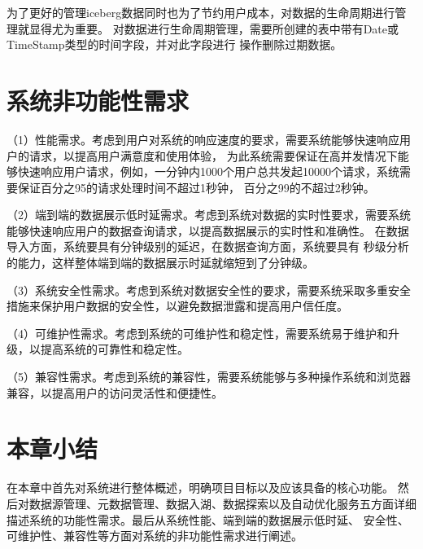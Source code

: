 为了更好的管理iceberg数据同时也为了节约用户成本，对数据的生命周期进行管理就显得尤为重要\cite{36}。
对数据进行生命周期管理，需要所创建的表中带有Date或TimeStamp类型的时间字段，并对此字段进行
操作删除过期数据。

\section{系统非功能性需求}

（1）性能需求。考虑到用户对系统的响应速度的要求，需要系统能够快速响应用户的请求，以提高用户满意度和使用体验，
为此系统需要保证在高并发情况下能够快速响应用户请求，例如，一分钟内1000个用户总共发起10000个请求，系统需要保证百分之95的请求处理时间不超过1秒钟，
百分之99的不超过2秒钟。

（2）端到端的数据展示低时延需求。考虑到系统对数据的实时性要求，需要系统能够快速响应用户的数据查询请求，以提高数据展示的实时性和准确性。
在数据导入方面，系统要具有分钟级别的延迟，在数据查询方面，系统要具有
秒级分析的能力，这样整体端到端的数据展示时延就缩短到了分钟级。

（3）系统安全性需求。考虑到系统对数据安全性的要求，需要系统采取多重安全措施来保护用户数据的安全性，以避免数据泄露和提高用户信任度。

（4）可维护性需求。考虑到系统的可维护性和稳定性，需要系统易于维护和升级，以提高系统的可靠性和稳定性。

（5）兼容性需求。考虑到系统的兼容性，需要系统能够与多种操作系统和浏览器兼容，以提高用户的访问灵活性和便捷性。

\section{本章小结}

在本章中首先对系统进行整体概述，明确项目目标以及应该具备的核心功能。
然后对数据源管理、元数据管理、数据入湖、数据探索以及自动优化服务五方面详细
描述系统的功能性需求。最后从系统性能、端到端的数据展示低时延、
安全性、可维护性、兼容性等方面对系统的非功能性需求进行阐述。
